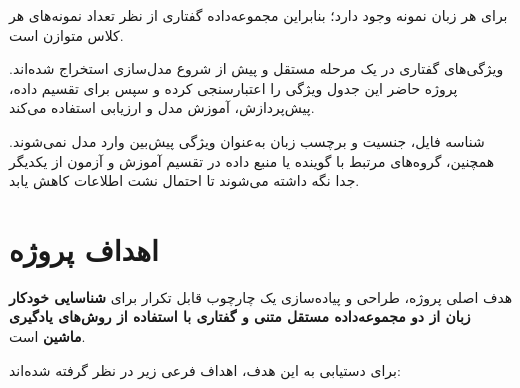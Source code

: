 \documentclass[12pt,a4paper,oneside]{report}
\begin{document}
برای هر زبان
نمونه وجود دارد؛ بنابراین مجموعه‌داده گفتاری از نظر تعداد نمونه‌های هر کلاس متوازن است.

ویژگی‌های گفتاری در یک مرحله مستقل و پیش از شروع مدل‌سازی استخراج شده‌اند. پروژه حاضر این جدول ویژگی را اعتبارسنجی کرده و سپس برای تقسیم داده، پیش‌پردازش، آموزش مدل و ارزیابی استفاده می‌کند.

شناسه فایل، جنسیت و برچسب زبان به‌عنوان ویژگی پیش‌بین وارد مدل نمی‌شوند. همچنین، گروه‌های مرتبط با گوینده یا منبع داده در تقسیم آموزش و آزمون از یکدیگر جدا نگه داشته می‌شوند تا احتمال نشت اطلاعات کاهش یابد.


\section{اهداف پروژه}

هدف اصلی پروژه، طراحی و پیاده‌سازی یک چارچوب قابل تکرار برای
\textbf{شناسایی خودکار زبان از دو مجموعه‌داده مستقل متنی و گفتاری با استفاده از روش‌های یادگیری ماشین}
است.

برای دستیابی به این هدف، اهداف فرعی زیر در نظر گرفته شده‌اند:
\end{document}
